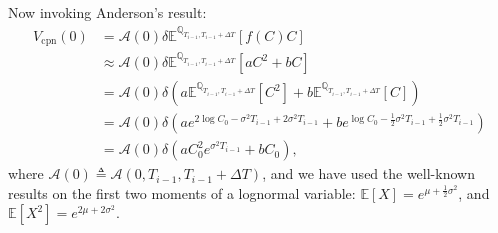 \documentclass[paper=a4, fontsize=11pt]{scrartcl} %
\numberwithin{equation}{section} %
\numberwithin{figure}{section} %
\numberwithin{table}{section} %
\begin{document}
Now invoking Anderson's result:
\begin{align*}
V_{\text{cpn}}(0) &= \mathcal{A}(0)\delta \mathbb{E}^{\mathbb{Q}_{T_{i-1},T_{i-1}+\Delta T}}\left[f(C)C\right]\\
 &\approx \mathcal{A}(0)\delta \mathbb{E}^{\mathbb{Q}_{T_{i-1},T_{i-1}+\Delta T}}\left[aC^2+bC\right]\\
 &= \mathcal{A}(0)\delta \left(a\mathbb{E}^{\mathbb{Q}_{T_{i-1},T_{i-1}+\Delta T}}\left[C^2\right]+b\mathbb{E}^{\mathbb{Q}_{T_{i-1},T_{i-1}+\Delta T}}\left[C\right]\right)\\
 &= \mathcal{A}(0)\delta \left(a e^{2\log C_0-\sigma^2 T_{i-1}+ 2\sigma^2 T_{i-1}} + b e^{\log C_0 - \frac{1}{2}\sigma^2 T_{i-1} + \frac{1}{2}\sigma^2 T_{i-1}}\right)\\
  &= \mathcal{A}(0)\delta \left(a C_0^2e^{\sigma^2 T_{i-1}} + b C_0\right),
\end{align*}
where $\mathcal{A}(0)\triangleq \mathcal{A}(0,T_{i-1},T_{i-1}+\Delta T)$, and we have used the well-known results on the first two moments of a lognormal variable: $\mathbb{E}[X]=e^{\mu + \frac{1}{2}\sigma^2}$, and $\mathbb{E}[X^2]=e^{2\mu+2\sigma^2}$.\\
\end{document}

